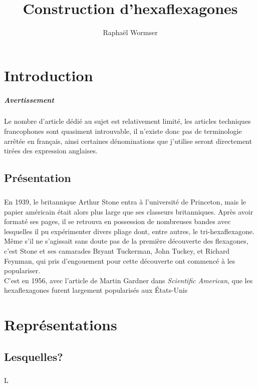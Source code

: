 \documentclass[11pt,a4paper]{report}
\author{Raphaël Wormser}
\title{Construction d'hexaflexagones}
\begin{document}
	\maketitle
	\titlepage
	
	\tableofcontents
	
	\chapter{Introduction}
		\paragraph{Avertissement}
		Le nombre d'article dédié au sujet est relativement limité, les articles techniques francophones sont quasiment introuvable, il n'existe donc pas de terminologie arrêtée en français, ainsi certaines dénominations que j'utilise seront directement tirées des expression anglaises.
				
	\section{Présentation}
		\paragraph{}
		En 1939, le britannique Arthur Stone entra à l'université de Princeton, mais le papier américain était alors plus large que ses classeurs britanniques. Après avoir formaté ses pages, il se retrouva en possession de nombreuses bandes avec lesquelles il pu expérimenter divers pliage dont, entre autres, le tri-hexaflexagone.\\
		Même s'il ne s'agissait sans doute pas de la première découverte des flexagones, c'est Stone et ses camarades Bryant Tuckerman, John Tuckey, et Richard Feynman, qui pris d'engouement pour cette découverte ont commencé à les populariser.\\
		C'est en 1956, avec l'article de Martin Gardner dans {\it Scientific American}, que les hexaflexagones furent largement popularisés aux États-Unis
			
	
	
	\chapter{Représentations}
	\section{Lesquelles?}
	\paragraph{}
	L%
\end{document}
